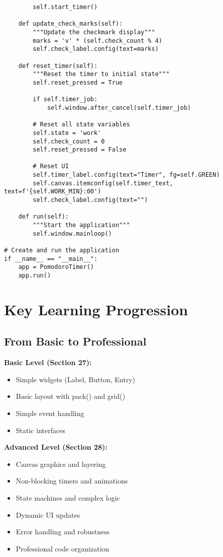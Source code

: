 \documentclass[12pt,a4paper]{article}
\begin{document}
\begin{tcolorbox}[colback=gray!5!white,colframe=gray!75!black,title=Complete Professional Pomodoro Timer]
\begin{lstlisting}
        self.start_timer()
    
    def update_check_marks(self):
        """Update the checkmark display"""
        marks = 'v' * (self.check_count % 4)
        self.check_label.config(text=marks)
    
    def reset_timer(self):
        """Reset the timer to initial state"""
        self.reset_pressed = True
        
        if self.timer_job:
            self.window.after_cancel(self.timer_job)
        
        # Reset all state variables
        self.state = 'work'
        self.check_count = 0
        self.reset_pressed = False
        
        # Reset UI
        self.timer_label.config(text="Timer", fg=self.GREEN)
        self.canvas.itemconfig(self.timer_text, text=f'{self.WORK_MIN}:00')
        self.check_label.config(text="")
    
    def run(self):
        """Start the application"""
        self.window.mainloop()

# Create and run the application
if __name__ == "__main__":
    app = PomodoroTimer()
    app.run()
\end{lstlisting}
\end{tcolorbox}

\section{Key Learning Progression}

\subsection{From Basic to Professional}

\textbf{Basic Level (Section 27):}
\begin{itemize}
    \item Simple widgets (Label, Button, Entry)
    \item Basic layout with pack() and grid()
    \item Simple event handling
    \item Static interfaces
\end{itemize}

\textbf{Advanced Level (Section 28):}
\begin{itemize}
    \item Canvas graphics and layering
    \item Non-blocking timers and animations
    \item State machines and complex logic
    \item Dynamic UI updates
    \item Error handling and robustness
    \item Professional code organization
\end{itemize}
\end{document}
